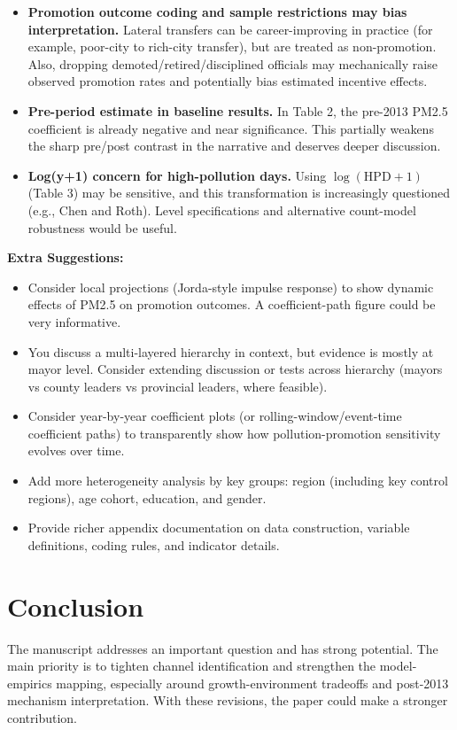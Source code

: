 \documentclass[12pt]{article}
\begin{document}
\begin{itemize}
    \item \textbf{Promotion outcome coding and sample restrictions may bias interpretation.}
    Lateral transfers can be career-improving in practice (for example, poor-city to rich-city transfer), but are treated as non-promotion. Also, dropping demoted/retired/disciplined officials may mechanically raise observed promotion rates and potentially bias estimated incentive effects.

    \item \textbf{Pre-period estimate in baseline results.}
    In Table 2, the pre-2013 PM2.5 coefficient is already negative and near significance. This partially weakens the sharp pre/post contrast in the narrative and deserves deeper discussion.

    \item \textbf{Log(y+1) concern for high-pollution days.}
    Using $\log(\text{HPD}+1)$ (Table 3) may be sensitive, and this transformation is increasingly questioned (e.g., Chen and Roth). Level specifications and alternative count-model robustness would be useful.
\end{itemize}

\noindent \textbf{Extra Suggestions:}
\begin{itemize}
    \item Consider local projections (Jorda-style impulse response) to show dynamic effects of PM2.5 on promotion outcomes. A coefficient-path figure could be very informative.

    \item You discuss a multi-layered hierarchy in context, but evidence is mostly at mayor level. Consider extending discussion or tests across hierarchy (mayors vs county leaders vs provincial leaders, where feasible).

    \item Consider year-by-year coefficient plots (or rolling-window/event-time coefficient paths) to transparently show how pollution-promotion sensitivity evolves over time.

    \item Add more heterogeneity analysis by key groups: region (including key control regions), age cohort, education, and gender.

    \item Provide richer appendix documentation on data construction, variable definitions, coding rules, and indicator details.
\end{itemize}

\section{Conclusion}

The manuscript addresses an important question and has strong potential. The main priority is to tighten channel identification and strengthen the model-empirics mapping, especially around growth-environment tradeoffs and post-2013 mechanism interpretation. With these revisions, the paper could make a stronger contribution.
\end{document}
